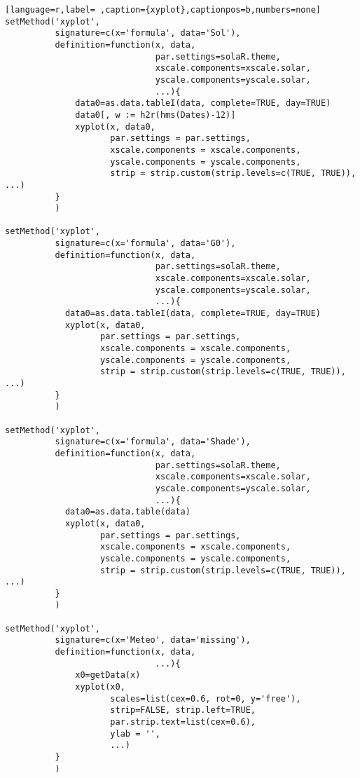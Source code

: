 \begin{lstlisting}[language=r,label= ,caption={xyplot},captionpos=b,numbers=none]
setMethod('xyplot',
          signature=c(x='formula', data='Sol'),
          definition=function(x, data,
                              par.settings=solaR.theme,
                              xscale.components=xscale.solar,
                              yscale.components=yscale.solar,
                              ...){
              data0=as.data.tableI(data, complete=TRUE, day=TRUE)
              data0[, w := h2r(hms(Dates)-12)]
              xyplot(x, data0,
                     par.settings = par.settings,
                     xscale.components = xscale.components,
                     yscale.components = yscale.components,
                     strip = strip.custom(strip.levels=c(TRUE, TRUE)), ...)
          }
          )

setMethod('xyplot',
          signature=c(x='formula', data='G0'),
          definition=function(x, data,
                              par.settings=solaR.theme,
                              xscale.components=xscale.solar,
                              yscale.components=yscale.solar,
                              ...){
            data0=as.data.tableI(data, complete=TRUE, day=TRUE)
            xyplot(x, data0,
                   par.settings = par.settings,
                   xscale.components = xscale.components,
                   yscale.components = yscale.components,
                   strip = strip.custom(strip.levels=c(TRUE, TRUE)), ...)
          }
          )

setMethod('xyplot',
          signature=c(x='formula', data='Shade'),
          definition=function(x, data,
                              par.settings=solaR.theme,
                              xscale.components=xscale.solar,
                              yscale.components=yscale.solar,
                              ...){
            data0=as.data.table(data)
            xyplot(x, data0,
                   par.settings = par.settings,
                   xscale.components = xscale.components,
                   yscale.components = yscale.components,
                   strip = strip.custom(strip.levels=c(TRUE, TRUE)), ...)
          }
          )

setMethod('xyplot',
          signature=c(x='Meteo', data='missing'),
          definition=function(x, data,
                              ...){
              x0=getData(x)
              xyplot(x0,
                     scales=list(cex=0.6, rot=0, y='free'),
                     strip=FALSE, strip.left=TRUE,
                     par.strip.text=list(cex=0.6),
                     ylab = '',
                     ...)
          }
          )


\end{lstlisting}

